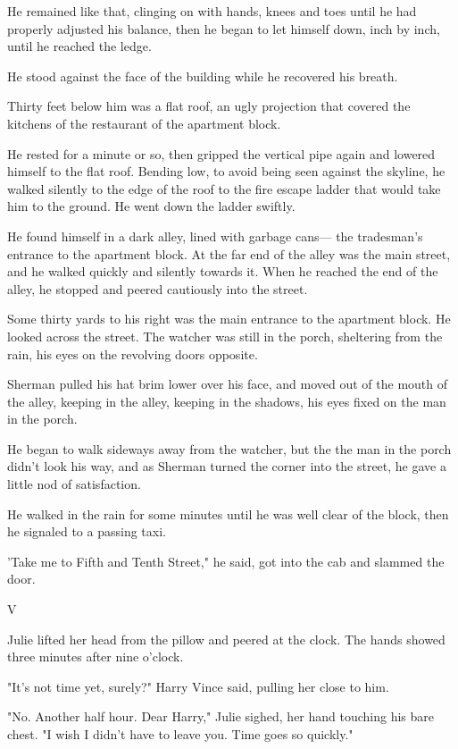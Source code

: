 \documentclass{novel}
\begin{document}
He remained like that, clinging on with hands, knees and toes until he had properly adjusted his balance, then he began to let himself down, inch by inch, until he reached the ledge.

He stood against the face of the building while he recovered his breath.

Thirty feet below him was a flat roof, an ugly projection that covered the kitchens of the restaurant of the apartment block.

He rested for a minute or so, then gripped the vertical pipe again and lowered himself to the flat roof. Bending low, to avoid being seen against the skyline, he walked silently to the edge of the roof to the fire escape ladder that would take him to the ground. He went down the ladder swiftly.

He found himself in a dark alley, lined with garbage cans— the tradesman's entrance to the apartment block. At the far end of the alley was the main street, and he walked quickly and silently towards it. When he reached the end of the alley, he stopped and peered cautiously into the street.

Some thirty yards to his right was the main entrance to the apartment block. He looked across the street. The watcher was still in the porch, sheltering from the rain, his eyes on the revolving doors opposite.

Sherman pulled his hat brim lower over his face, and moved out of the mouth of the alley, keeping in the alley, keeping in the shadows, his eyes fixed on the man in the porch.

He began to walk sideways away from the watcher, but the the man in the porch didn't look his way, and as Sherman turned the corner into the street, he gave a little nod of satisfaction.

He walked in the rain for some minutes until he was well clear of the block, then he signaled to a passing taxi.

'Take me to Fifth and Tenth Street," he said, got into the cab and slammed the door.



V

Julie lifted her head from the pillow and peered at the clock. The hands showed three minutes after nine o'clock.

"It's not time yet, surely?" Harry Vince said, pulling her close to him.

"No. Another half hour. Dear Harry," Julie sighed, her hand touching his bare chest. "I wish I didn't have to leave you. Time goes so quickly."
\end{document}
